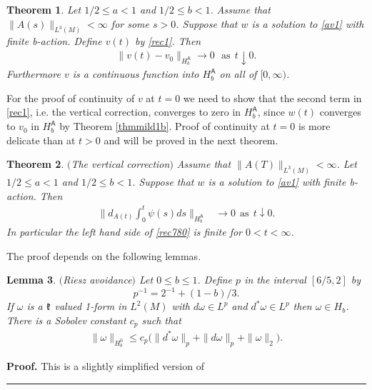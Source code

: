 \documentclass[12pt]{article}
\newtheorem{theorem}{Theorem}[section]
\newtheorem{lemma}[theorem]{Lemma}
\newenvironment{proof}[1][Proof]{\textbf{#1.} }{\ \rule{0.5em}{0.5em}}
\def \As{\mathsf{A}}
\def \w{\omega}
\def \kf{\frak k}
\def \beq{\begin{equation}}
\def \eeq{\end{equation}}
\def \eref{\eqref}
\numberwithin{equation}{section}
\begin{document}
         \begin{theorem} \label{thmrec7o}  
 Let $ 1/2 \le a <1$ and $1/2 \le b <1$. Assume that $\|A(s)\|_{L^3(M)} < \infty$ for some $s >0$.
 Suppose that $w$ is a solution to \eref{av1} with finite b-action.
 Define $v(t)$ by \eref{rec1}.   Then
 \begin{align}
 \|v(t) - v_0\|_{H_b^\As} \rightarrow 0 \ \ \  \text{as}  \ \ t\downarrow 0.   \label{rec779}
 \end{align} 
 Furthermore $v$ is a continuous function into $H_b^\As$ on all of $[0, \infty)$.
 \end{theorem}
 
 For the proof of continuity of $v$ at $t=0$ we need to show that
the second term in \eref{rec1}, i.e. the vertical correction,  converges to zero in $H_b^\As$,
since $w(t)$ converges to $v_0$ in $H_b^\As$ by Theorem \ref{thmmild1b}.
Proof of continuity at $t =0$ is more delicate than at  $t >0$  and  will be proved in the next theorem.


 \begin{theorem} \label{thmrec7} $($The vertical correction$)$           
 Assume that $\|A(T)\|_{L^3(M)} <\infty$.  
  Let $ 1/2 \le a <1$ and $1/2 \le b <1$. Suppose that $w$ is a solution to \eref{av1} with finite b-action.
 Then
\begin{align}
\| d_{A(t)} \int_0^t   \psi(s) ds \|_{H_b^\As }&\rightarrow 0\ \  \text{as}  \ \ t\downarrow 0.\label{rec780}
\end{align}
In particular the left hand side of \eref{rec780} is finite for $0 < t <\infty $.

\end{theorem}
 
     The proof depends on the following lemmas.
     
  \begin{lemma}\label{lemstrat2}   $($Riesz avoidance$)$  
  Let $0 \le b \le 1$. Define $p$ in the interval $[6/5, 2]$ by  
\beq
p^{-1} = 2^{-1} +(1-b)/3.    \label{rec864}
\eeq  
 If $\w$ is a $\kf$ valued 1-form in $L^2(M)$ with $d\w \in L^p$ and $d^*\w \in L^p$  then $ \w \in H_b$.
  There is a Sobolev constant   $c_p$ 
  such that
  \begin{align}
\|\w\|_{H_b^0} \le c_p\Big(\|d^* \w\|_p + \| d\w\|_p + \|\w\|_2\Big).    \label{h514s}
\end{align}
 \end{lemma}
          \begin{proof} This is a slightly simplified version of \cite[Lemma 6.17]{G70} 
 \end{proof}
\end{document}
